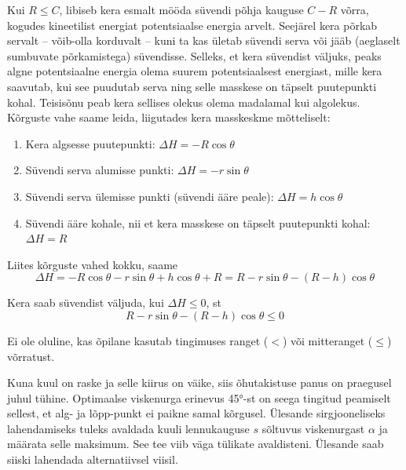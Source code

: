 \documentclass[10pt]{article}
\begin{document}
Kui $R \leq C$, libiseb kera esmalt mööda süvendi põhja kauguse $C - R$ võrra, kogudes kineetilist energiat potentsiaalse energia arvelt. Seejärel kera põrkab servalt -- võib-olla korduvalt -- kuni ta kas ületab süvendi serva või jääb (aeglaselt sumbuvate põrkamistega) süvendisse. Selleks, et kera süvendist väljuks, peaks algne potentsiaalne energia olema suurem potentsiaalsest energiast, mille kera saavutab, kui see puudutab serva ning selle masskese on täpselt puutepunkti kohal. Teisisõnu peab kera sellises olekus olema madalamal kui algolekus. Kõrguste vahe saame leida, liigutades kera masskeskme mõtteliselt:
\begin{enumerate}
    \item Kera algsesse puutepunkti: $\Delta H = -R\cos\theta$
    \item Süvendi serva alumisse punkti: $\Delta H = -r\sin\theta$
    \item Süvendi serva ülemisse punkti (süvendi ääre peale): $\Delta H = h\cos\theta$
    \item Süvendi ääre kohale, nii et kera masskese on täpselt puutepunkti kohal: $\Delta H = R$
\end{enumerate}
Liites kõrguste vahed kokku, saame
\begin{equation*}
    \Delta H = -R\cos\theta - r\sin\theta + h\cos\theta + R = R-r\sin\theta-(R-h)\cos\theta
\end{equation*}

Kera saab süvendist väljuda, kui $\Delta H \leq 0$, st
\begin{equation*}
    R-r\sin\theta-(R-h)\cos\theta \leq 0
\end{equation*}

Ei ole oluline, kas õpilane kasutab tingimuses ranget ($<$) või mitteranget ($\leq$) võrratust.
\probend
\bigskip


\solu
\par

Kuna kuul on raske ja selle kiirus on väike, siis õhutakistuse panus on praegusel juhul tühine. Optimaalse viskenurga erinevus \ang{45}-st on seega tingitud peamiselt sellest, et alg- ja lõpp-punkt ei paikne samal kõrgusel. Ülesande sirgjooneliseks lahendamiseks tuleks avaldada kuuli lennukauguse $s$ sõltuvus viskenurgast $\alpha$ ja määrata selle maksimum. See tee viib väga tülikate avaldisteni. Ülesande saab siiski lahendada alternatiivsel viisil.
\end{document}
